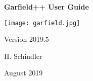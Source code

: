 \begin{titlepage}
  {
  \centering
  \sffamily
  \linespread{1.5}

  \vspace{3cm} 

  \huge{\textbf{Garfield++ User Guide}}

  \vspace{2cm}

  \texttt{[image: garfield.jpg]}

  \vspace{2cm}

  \large
  Version 2019.5 

  \vspace{2cm}
  \large
  H. Schindler

  \vfill

  August 2019

  }
\end{titlepage}
